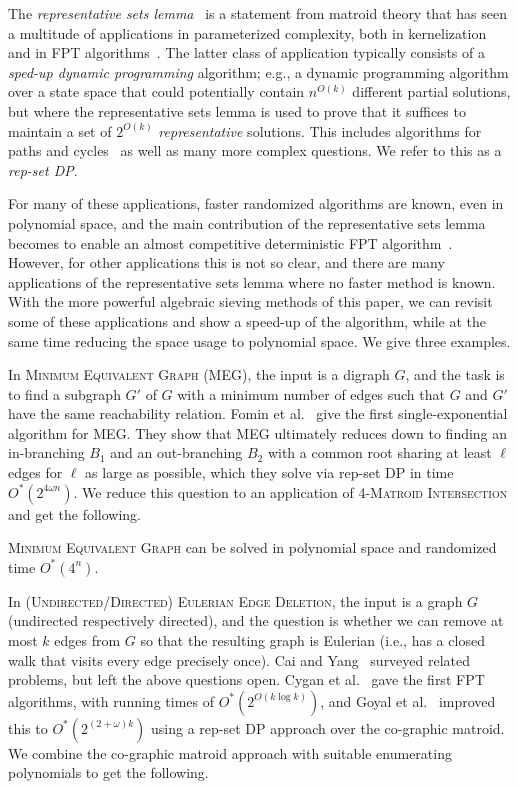 \documentclass{theoretics}
\begin{document}
The \emph{representative sets lemma}~\cite{Lovasz1977,Marx09-matroid}
is a statement from matroid theory that has seen a multitude of
applications in parameterized complexity, both in kernelization~\cite{KratschW20JACM}
and in FPT algorithms~\cite{FominLPS16JACM,Marx09-matroid}. The latter
class of application typically consists of a \emph{sped-up dynamic programming}
algorithm; e.g., a dynamic programming algorithm over a state space
that could potentially contain $n^{O(k)}$ different partial solutions,
but where the representative sets lemma is used to prove that it
suffices to maintain a set of $2^{O(k)}$ \emph{representative}
solutions. This includes
algorithms for paths and cycles~\cite{FominLPS16JACM}
as well as many more complex questions.
We refer to this as a \emph{rep-set DP}.

For many of these applications, faster randomized algorithms are known, even in
polynomial space, and the main contribution
of the representative sets lemma becomes to enable an almost competitive 
deterministic FPT algorithm~\cite{FominLPS16JACM,Tsur19b}.
However, for other applications this is not so clear, and there are
many applications of the representative sets lemma where no faster
method is known.
With the more powerful algebraic sieving methods of this paper, 
we can revisit some of these applications and show a speed-up of the
algorithm, while at the same time reducing the space usage to
polynomial space. We give three examples.

In \textsc{Minimum Equivalent Graph} (MEG), the input is a
digraph $G$, and the task is to find a subgraph $G'$ of $G$ with a
minimum number of edges such that $G$ and $G'$ have the same
reachability relation. Fomin et al.~\cite{FominLPS16JACM} give the
first single-exponential algorithm for MEG.
They show that MEG ultimately reduces down to finding an in-branching
$B_1$ and an out-branching $B_2$ with a common root sharing at least
$\ell$ edges for $\ell$ as large as possible, which they solve via rep-set DP in time $O^*(2^{4 \omega n})$. 
We reduce this question to an application of
\textsc{4-Matroid Intersection} and get the following.

\begin{theorem} \label{ithm:MEG}
  \textsc{Minimum Equivalent Graph} can be solved in polynomial space
  and randomized time $O^*(4^{n})$. 
\end{theorem}

In \textsc{(Undirected/Directed) Eulerian Edge Deletion}, 
the input is a graph $G$ (undirected respectively directed),
and the question is whether we can remove at most $k$ edges from $G$
so that the resulting graph is Eulerian (i.e., has a closed walk that
visits every edge precisely once). Cai and Yang~\cite{CaiY11} surveyed
related problems, but left the above questions open. Cygan et al.~\cite{CyganMPPS14euler}
gave the first FPT algorithms, with running times of $O^*(2^{O(k \log k)})$,
and Goyal et al.~\cite{GoyalMPPS18even} improved this to $O^*(2^{(2+\omega)k})$
using a rep-set DP approach over the co-graphic matroid.
We combine the co-graphic matroid approach with suitable enumerating
polynomials to get the following.
\end{document}
